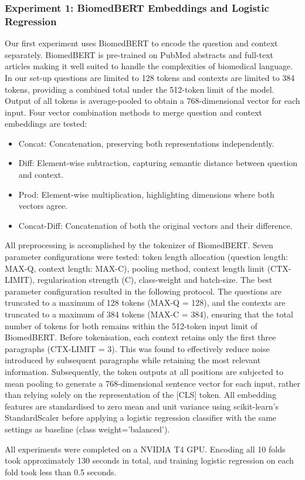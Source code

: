 \documentclass[11pt]{article}
\begin{document}
\subsubsection{Experiment 1: BiomedBERT Embeddings and Logistic Regression}
Our first experiment uses BiomedBERT to encode the question and context separately. BiomedBERT is pre-trained on PubMed abstracts and full-text articles making it well suited to handle the complexities of biomedical language. In our set-up questions are limited to 128 tokens and contexts are limited to 384 tokens, providing a combined total under the 512-token limit of the model. Output of all tokens is average-pooled to obtain a 768-dimensional vector for each input. Four vector combination methods to merge question and context embeddings are tested: 
\begin{itemize}
\item Concat: Concatenation, preserving both representations independently.
\item Diff: Element-wise subtraction, capturing semantic distance between question and context.
\item Prod: Element-wise multiplication, highlighting dimensions where both vectors agree.
\item Concat-Diff: Concatenation of both the original vectors and their difference.
\end{itemize}
All preprocessing is accomplished by the tokenizer of BiomedBERT. Seven parameter configurations were tested: token length allocation (question length: MAX-Q, context length: MAX-C), pooling method, context length limit (CTX-LIMIT), regularisation strength (C), class-weight and batch-size. The best parameter configuration resulted in the following protocol. The questions are truncated to a maximum of 128 tokens (MAX-Q = 128), and the contexts are truncated to a maximum of 384 tokens (MAX-C = 384), ensuring that the total number of tokens for both remains within the 512-token input limit of BiomedBERT. Before tokenisation, each context retains only the first three paragraphs (CTX-LIMIT = 3). This was found to effectively reduce noise introduced by subsequent paragraphs while retaining the most relevant information. Subsequently, the token outputs at all positions are subjected to mean pooling to generate a 768-dimensional sentence vector for each input, rather than relying solely on the representation of the [CLS] token. All embedding features are standardised to zero mean and unit variance using scikit-learn’s StandardScaler before applying a logistic regression classifier with the same settings as baseline (class weight=’balanced’). \par
All experiments were completed on a NVIDIA T4 GPU. Encoding all 10 folds took approximately 130 seconds in total, and training logistic regression on each fold took less than 0.5 seconds. \par
\end{document}

